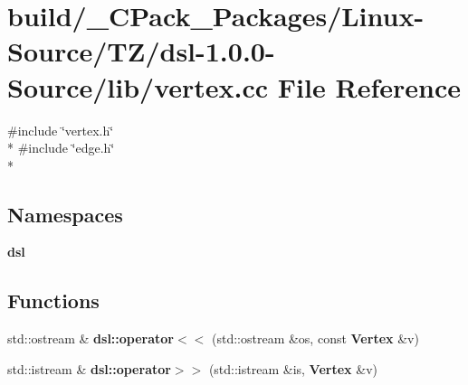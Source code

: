 \section{build/\-\_\-\-C\-Pack\-\_\-\-Packages/\-Linux-\/\-Source/\-T\-Z/dsl-\/1.0.0-\/\-Source/lib/vertex.cc File Reference}
\label{build_2__CPack__Packages_2Linux-Source_2TZ_2dsl-1_80_80-Source_2lib_2vertex_8cc}
{\ttfamily \#include \char`\"{}vertex.\-h\char`\"{}}\\*
{\ttfamily \#include \char`\"{}edge.\-h\char`\"{}}\\*
\subsection*{Namespaces}
\begin{DoxyCompactItemize}
\item 
{\bf dsl}
\end{DoxyCompactItemize}
\subsection*{Functions}
\begin{DoxyCompactItemize}
\item 
std\-::ostream \& {\bf dsl\-::operator$<$$<$} (std\-::ostream \&os, const {\bf Vertex} \&v)
\item 
std\-::istream \& {\bf dsl\-::operator$>$$>$} (std\-::istream \&is, {\bf Vertex} \&v)
\end{DoxyCompactItemize}
